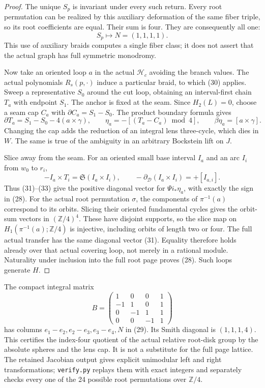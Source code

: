 \documentclass[11pt]{article}
\newcommand{\Z}{\mathbb Z}
\newcommand{\calH}{\mathcal H}
\newcommand{\calD}{\mathcal D}
\begin{document}
\begin{proof}
The unique \(S_p\) is invariant under every such return.
Every root permutation can be realized by this auxiliary
deformation of the same fiber triple, so its root coefficients
are equal. Their sum is four. They are consequently all one:
\[
                       S_p\longmapsto
                  N=(1,1,1,1).                    \tag{31}
\]
This use of auxiliary braids computes a single fiber class;
it does not assert that the actual graph has full symmetric
monodromy.

Now take an oriented loop \(a\) in the actual \(\calH_c\)
avoiding the branch values. The actual polynomials
\(R_s(p,\cdot)\) induce a particular braid, to which (30)
applies. Sweep a representative \(S_0\) around the cut loop,
obtaining an interval-first chain \(T_a\) with endpoint \(S_1\).
The anchor is fixed at the seam. Since \(H_2(L)=0\), choose
a seam cap \(C_a\) with \(\partial C_a=S_1-S_0\).
The product boundary formula gives
\[
 \partial T_a=S_1-S_0-4(a\times\gamma),\qquad
 \eta_a=-[(T_a-C_a)\bmod4],\qquad
 \beta\eta_a=[a\times\gamma].                       \tag{32}
\]
Changing the cap adds the reduction of an integral lens
three-cycle, which dies in \(W\). The same is true of the
ambiguity in an arbitrary Bockstein lift on \(J\).

Slice away from the seam. For an oriented small base interval \(I_a\)
and an arc \(I_i\) from \(w_0\) to \(r_i\),
\[
 -I_a\times T_i=\mathfrak S(I_a\times I_i),\qquad
 -\partial_{\calD}(I_a\times I_i)=+[I_{a,i}].
                                                               \tag{33}
\]
Thus (31)--(33) give the positive diagonal vector for
\(\Psi i_*\eta_a\), with exactly the sign in (28).
For the actual root permutation \(\sigma\), the components of
\(\pi^{-1}(a)\) correspond to its orbits. Slicing their oriented
fundamental cycles gives the orbit-sum vectors in \((\Z/4)^4\).
These have disjoint supports, so the slice map on
\(H_1(\pi^{-1}(a);\Z/4)\) is injective, including orbits of
length two or four. The full actual transfer has the same
diagonal vector (31). Equality therefore holds already over
that actual covering loop, not merely in a rational module.
Naturality under inclusion into the full root page proves (28).
Such loops generate \(H\).
\end{proof}

The compact integral matrix
\[
 B=\begin{pmatrix}
 1&0&0&1\\-1&1&0&1\\0&-1&1&1\\0&0&-1&1
 \end{pmatrix}                                    \tag{34}
\]
has columns \(e_1-e_2,e_2-e_3,e_3-e_4,N\) in (29).
Its Smith diagonal is \((1,1,1,4)\).
This certifies the index-four quotient of the actual relative
root-disk group by the absolute spheres and the lens cap.
It is not a substitute for the full page lattice.
The retained Jacobian output gives explicit unimodular left
and right transformations; \texttt{verify.py} replays them
with exact integers and separately checks every one of the
24 possible root permutations over \(\Z/4\).
\end{document}
